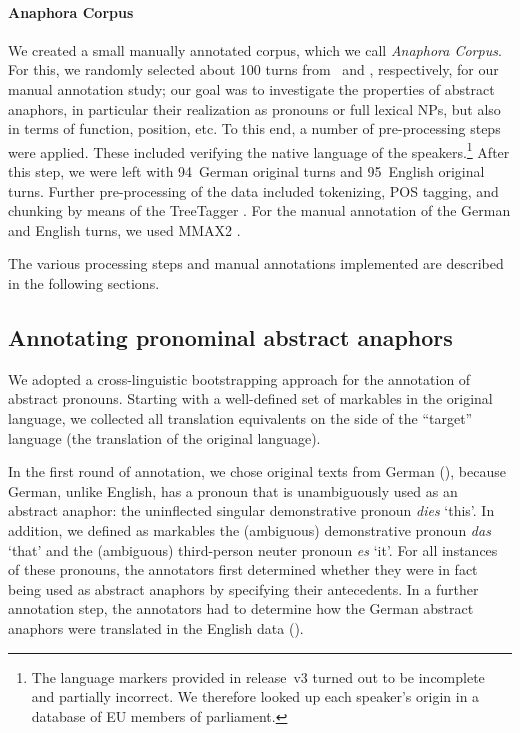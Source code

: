 \documentclass[output=paper]{LSP/langsci}
\begin{document}
\paragraph*{Anaphora Corpus} We created a small manually annotated corpus, which we
call \textit{Anaphora Corpus}. For this, we randomly selected about 100 turns from \DEo\ and \ENo, respectively, for our manual annotation study; our goal was to investigate the properties of abstract anaphors, in particular  their realization as pronouns or full lexical NPs, but also in terms of  function, position, etc. To this end, a number of pre-processing steps were applied. These included verifying the native language of the speakers.\footnote{The language markers provided in release~v3 turned out to be incomplete and partially incorrect. We therefore looked up each speaker's origin in a database of EU members of parliament.} After this step, we were  left with 94~German original turns and 95~English original turns.  Further pre-processing of the data included tokenizing, POS tagging, and chunking by means of the TreeTagger \citep{TreeTagger}. For the manual annotation of the German and English turns, we used MMAX2 \citep{mueller06b}.
 
The various processing steps and manual annotations implemented are described in the following sections. 



\subsection{Annotating pronominal abstract anaphors}\label{sec:corpusPron}

We adopted a cross-linguistic bootstrapping approach for the annotation of abstract pronouns. Starting with a well-defined set of markables in the original language, we collected all translation equivalents on the side of the ``target'' language (the translation of the original language). 

In the first round of annotation, we chose original texts from German (\DEo), because  German, unlike English, has a pronoun that is unambiguously used as an abstract anaphor: the uninflected singular demonstrative pronoun \textit{dies} `this'. In addition, we defined as markables the (ambiguous) demonstrative pronoun \textit{das} `that' and the (ambiguous) third-person neuter pronoun \textit{es} `it'. For all instances of these pronouns, the annotators first determined whether they were in fact being used as abstract anaphors by specifying their antecedents. In a further annotation step, the annotators had to determine how the German abstract anaphors were translated in the English data (\ENt).
\end{document}
